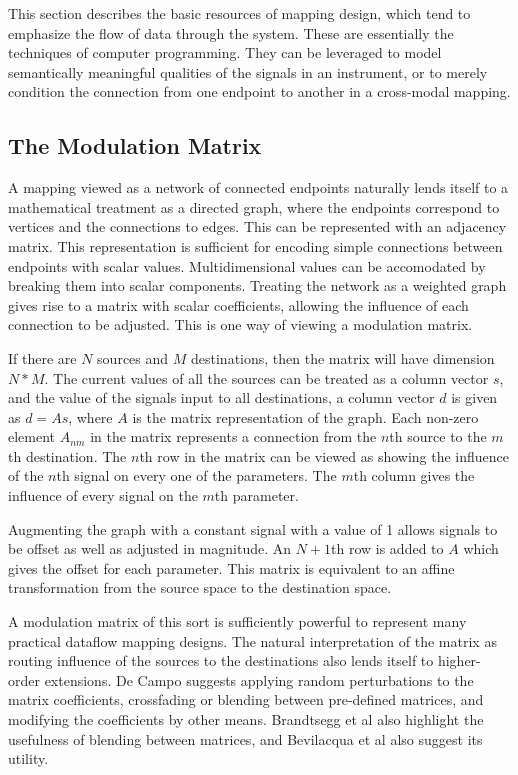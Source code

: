 \documentclass[main.tex]{subfiles}
\begin{document}
This section describes the basic resources of mapping design, which tend to
emphasize the flow of data through the system. These are essentially the
techniques of computer programming. They can be leveraged to model semantically
meaningful qualities of the signals in an instrument, or to merely condition
the connection from one endpoint to another in a cross-modal mapping.

\subsection{The Modulation Matrix}

A mapping viewed as a network of connected endpoints naturally lends itself to a mathematical treatment
as a directed graph, where the endpoints correspond to vertices and the connections to edges. This can be
represented with an adjacency matrix. This representation is sufficient for encoding simple connections
between endpoints with scalar values. Multidimensional values can be accomodated by breaking them into
scalar components. Treating the network as a weighted graph gives rise to a matrix
with scalar coefficients, allowing the influence of each connection to be adjusted.  This is one way
of viewing a modulation matrix.

If there are $N$ sources and $M$ destinations, then the matrix will have dimension $N*M$. The current values
of all the sources can be treated as a column vector $s$, and the value of the signals input to all
destinations, a column vector $d$ is given as $d = As$, where $A$ is the matrix representation of the graph.
Each non-zero element $A_{nm}$ in the matrix represents a connection from the $n$th source to the $m$th destination.
The $n$th row in the matrix can be viewed as showing the influence of the $n$th signal on every one of the parameters.
The $m$th column gives the influence of every signal on the $m$th parameter.

Augmenting the graph with a constant signal with a value of 1 allows signals to be offset as well as
adjusted in magnitude. An $N+1$th row is added to $A$ which gives the offset for each parameter.
This matrix is equivalent to an affine transformation from the source space to the destination space.

A modulation matrix of this sort is sufficiently powerful to represent many practical dataflow mapping designs.
The natural interpretation of the matrix as routing influence of the sources to the destinations also lends itself to
higher-order extensions. De Campo \cite{decampo2014icmc_metacontrol} suggests applying random perturbations
to the matrix coefficients, crossfading or blending between pre-defined matrices, and modifying the coefficients
by other means. Brandtsegg et al \cite{Brandtsegg2011} also highlight the usefulness of blending between
matrices, and Bevilacqua et al \cite{bevilacqua2005nime_mnm} also suggest its utility.
\end{document}
